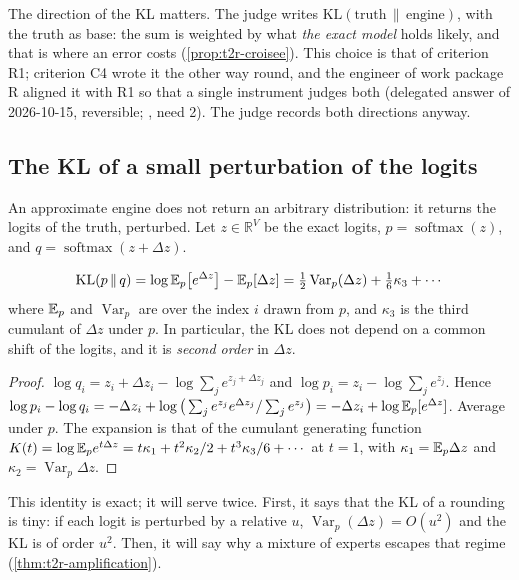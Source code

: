 The direction of the KL matters. The judge writes $\mathrm{KL}(\text{truth}\,\|\,\text{engine})$, with the truth as base: the sum is weighted by what \emph{the exact model} holds likely, and that is where an error costs (\cref{prop:t2r-croisee}). This choice is that of criterion R1; criterion C4 wrote it the other way round, and the engineer of work package R aligned it with R1 so that a single instrument judges both (delegated answer of 2026-10-15, reversible; , need 2). The judge records both directions anyway.

\subsection{The KL of a small perturbation of the logits}\label{sec:t2r-cumulants}

An approximate engine does not return an arbitrary distribution: it returns the logits of the truth, perturbed. Let $z \in \mathbb{R}^V$ be the exact logits, $p = \operatorname{softmax}(z)$, and $q = \operatorname{softmax}(z + \Delta z)$.

\begin{proposition}\label{prop:t2r-cumulants}
\begin{equation}\label{eq:t2r-cumulants}
\mathrm{KL}(p\,\|\,q) = \log \mathbb{E}_p\big[e^{\Delta z}\big] - \mathbb{E}_p[\Delta z] = \tfrac12\operatorname{Var}_p(\Delta z) + \tfrac16\kappa_3 + \cdots
\end{equation}
where $\mathbb{E}_p$ and $\operatorname{Var}_p$ are over the index $i$ drawn from $p$, and $\kappa_3$ is the third cumulant of $\Delta z$ under $p$. In particular, the KL does not depend on a common shift of the logits, and it is \emph{second order} in $\Delta z$.
\end{proposition}

\begin{proof}
$\log q_i = z_i + \Delta z_i - \log\sum_j e^{z_j + \Delta z_j}$ and $\log p_i = z_i - \log\sum_j e^{z_j}$. Hence $\log p_i - \log q_i = -\Delta z_i + \log\big(\sum_j e^{z_j}e^{\Delta z_j}/\sum_j e^{z_j}\big) = -\Delta z_i + \log \mathbb{E}_p[e^{\Delta z}]$. Average under $p$. The expansion is that of the cumulant generating function $K(t) = \log \mathbb{E}_p e^{t\Delta z} = t\kappa_1 + t^2\kappa_2/2 + t^3\kappa_3/6 + \cdots$ at $t = 1$, with $\kappa_1 = \mathbb{E}_p\Delta z$ and $\kappa_2 = \operatorname{Var}_p \Delta z$.
\end{proof}

This identity is exact; it will serve twice. First, it says that the KL of a rounding is tiny: if each logit is perturbed by a relative $u$, $\operatorname{Var}_p(\Delta z) = O(u^2)$ and the KL is of order $u^2$. Then, it will say why a mixture of experts escapes that regime (\cref{thm:t2r-amplification}).

